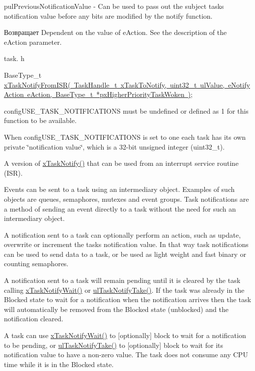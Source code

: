 pul\+Previous\+Notification\+Value -\/ Can be used to pass out the subject task\textquotesingle{}s notification value before any bits are modified by the notify function.

\begin{DoxyReturn}{Возвращает}
Dependent on the value of e\+Action. See the description of the e\+Action parameter.
\end{DoxyReturn}
task. h 
\begin{DoxyPre}BaseType\_t \mbox{\hyperlink{task_8h_a1ed9129068b96a909356bd0369c5ecb0}{xTaskNotifyFromISR( TaskHandle\_t xTaskToNotify, uint32\_t ulValue, eNotifyAction eAction, BaseType\_t *pxHigherPriorityTaskWoken )}};\end{DoxyPre}


config\+U\+S\+E\+\_\+\+T\+A\+S\+K\+\_\+\+N\+O\+T\+I\+F\+I\+C\+A\+T\+I\+O\+NS must be undefined or defined as 1 for this function to be available.

When config\+U\+S\+E\+\_\+\+T\+A\+S\+K\+\_\+\+N\+O\+T\+I\+F\+I\+C\+A\+T\+I\+O\+NS is set to one each task has its own private \char`\"{}notification value\char`\"{}, which is a 32-\/bit unsigned integer (uint32\+\_\+t).

A version of \mbox{\hyperlink{task_8h_a0d2d54fb8a64011dfbb54983e4ed06bd}{x\+Task\+Notify()}} that can be used from an interrupt service routine (I\+SR).

Events can be sent to a task using an intermediary object. Examples of such objects are queues, semaphores, mutexes and event groups. Task notifications are a method of sending an event directly to a task without the need for such an intermediary object.

A notification sent to a task can optionally perform an action, such as update, overwrite or increment the task\textquotesingle{}s notification value. In that way task notifications can be used to send data to a task, or be used as light weight and fast binary or counting semaphores.

A notification sent to a task will remain pending until it is cleared by the task calling \mbox{\hyperlink{task_8h_a0475fcda9718f403521c270a7270ff93}{x\+Task\+Notify\+Wait()}} or \mbox{\hyperlink{task_8h_a66540bef602522a01a519f776e4c07d8}{ul\+Task\+Notify\+Take()}}. If the task was already in the Blocked state to wait for a notification when the notification arrives then the task will automatically be removed from the Blocked state (unblocked) and the notification cleared.

A task can use \mbox{\hyperlink{task_8h_a0475fcda9718f403521c270a7270ff93}{x\+Task\+Notify\+Wait()}} to \mbox{[}optionally\mbox{]} block to wait for a notification to be pending, or \mbox{\hyperlink{task_8h_a66540bef602522a01a519f776e4c07d8}{ul\+Task\+Notify\+Take()}} to \mbox{[}optionally\mbox{]} block to wait for its notification value to have a non-\/zero value. The task does not consume any C\+PU time while it is in the Blocked state.

